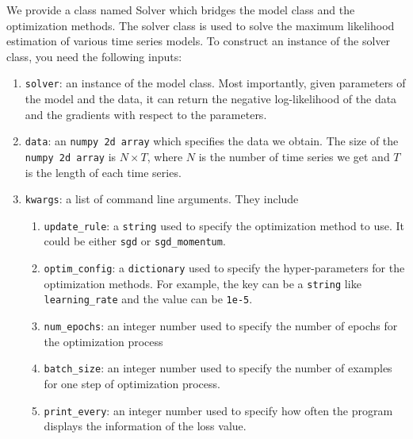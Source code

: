 We provide a class named Solver which bridges the model class and the optimization methods. The solver class is used to solve the maximum likelihood estimation of various time series models. To construct an instance of the solver class, you need the following inputs:
\begin{enumerate}
\item  \texttt{solver}: an instance of the model class. Most importantly, given parameters of the model and the data, it can return the negative log-likelihood of the data and the gradients with respect to the parameters.
\item \texttt{data}:  an  \texttt{numpy 2d array} which specifies the data we obtain. The size of the \texttt{numpy 2d array} is $N \times T$, where $N$ is the number of time series we get and $T$ is the length of each time series.
\item  \texttt{kwargs}: a list of command line arguments. They include
	\begin{enumerate}
		\item \texttt{update\_rule}: a \texttt{string} used to specify the optimization method to use. It could be either \texttt{sgd} or \texttt{sgd\_momentum}. 
		\item \texttt{optim\_config}: a \texttt{dictionary} used to specify the hyper-parameters for the optimization methods. For example, the key can be a \texttt{string} like \texttt{learning\_rate} and the value can be \texttt{1e-5}. 
		\item \texttt{num\_epochs}: an integer number used to specify the number of epochs for the optimization process
		\item \texttt{batch\_size}: an integer number used to specify the number of examples for one step of optimization process.
		\item \texttt{print\_every}: an integer number used to specify how often the program displays the information of the loss value.
	\end{enumerate}
\end{enumerate} 

